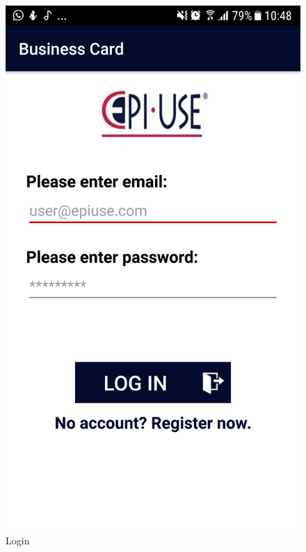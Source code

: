 \documentclass[english]{article}
\begin{document}
\begin{figure}[!htb]
  \includegraphics[width=\linewidth]{Login.png}
  \caption{Login}\label{Login}
\endminipage\hfill
{}

\end{figure}
\end{document}
